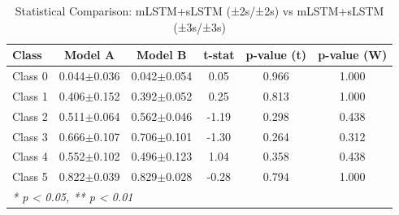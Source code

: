 \begin{table}[htbp]
\centering
\caption{Statistical Comparison: mLSTM+sLSTM (±2s/±2s) vs mLSTM+sLSTM (±3s/±3s)}
\label{tab:comparison_class_mlstmslstm_±2s_±2s_vs_mlstmslstm_±3s_±3s}
\begin{tabular}{lccccc}
\toprule
\textbf{Class} & \textbf{Model A} & \textbf{Model B} & \textbf{t-stat} & \textbf{p-value (t)} & \textbf{p-value (W)} \\
\midrule
Class 0 & 0.044$\pm$0.036 & 0.042$\pm$0.054 & 0.05 & 0.966 & 1.000 \\
Class 1 & 0.406$\pm$0.152 & 0.392$\pm$0.052 & 0.25 & 0.813 & 1.000 \\
Class 2 & 0.511$\pm$0.064 & 0.562$\pm$0.046 & -1.19 & 0.298 & 0.438 \\
Class 3 & 0.666$\pm$0.107 & 0.706$\pm$0.101 & -1.30 & 0.264 & 0.312 \\
Class 4 & 0.552$\pm$0.102 & 0.496$\pm$0.123 & 1.04 & 0.358 & 0.438 \\
Class 5 & 0.822$\pm$0.039 & 0.829$\pm$0.028 & -0.28 & 0.794 & 1.000 \\
\bottomrule
\multicolumn{6}{l}{\textit{* p < 0.05, ** p < 0.01}} \\
\end{tabular}
\end{table}